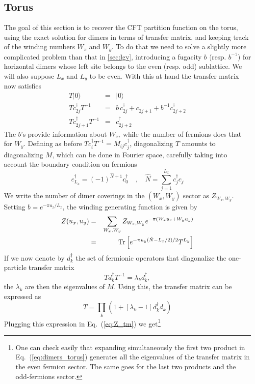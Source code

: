 \documentclass[11pt]{iopart}
\begin{document}
\subsection{Torus}
The goal of this section is to recover the CFT partition function on the torus, using the exact solution for dimers in terms of transfer matrix, and keeping track of the winding numbers $W_x$ and $W_y$. To do that we need to solve a slightly more complicated problem than that in \ref{sec:lgv}, introducing a fugacity $b$ (resp. $b^{-1}$) for horizontal dimers whose left site belongs to the even (resp. odd) sublattice. We will also suppose $L_x$ and $L_y$ to be even. With this at hand the transfer matrix now satisfies
\begin{eqnarray}
T|0\rangle&=&|0\rangle\\
T c_{2j}^\dag T^{-1}&=&b \,c_{2j}^\dag+c_{2j+1}^\dag +b^{-1}c_{2j+2}^\dag\\
T c_{2j+1}^\dag T^{-1}&=&c_{2j+2}^\dag
\end{eqnarray}
The $b$'s provide information about $W_x$, while the number of fermions does that for $W_y$. 
Defining as before $T c_i^\dag T^{-1}=M_{ij} c_j^\dag$, diagonalizing $T$ amounts to diagonalizing $M$, which can be done in Fourier space, carefully taking into account the boundary condition on fermions
\begin{equation}
 c_{L_x}^\dag=(-1)^{\hat{N}+1}c_0^\dag\quad,\quad \hat{N}=\sum_{j=1}^{L_x} c^\dag_j c_j
\end{equation}
We write the number of dimer coverings in the $(W_x,W_y)$ sector as $Z_{W_x,W_y}$. Setting $b=e^{-\pi u_x/L_x}$, the winding generating function is given by
\begin{eqnarray}
 Z(u_x,u_y)&=&\sum_{W_x,W_y} Z_{W_x,W_y}e^{-\pi (W_x u_x+W_y u_y)}\\\label{eq:Z_tm}
 &=&{\rm Tr}\left[\displaystyle{e^{-\pi u_y(\hat{N}-L_x/2)/2}T^{L_y}}\right]
\end{eqnarray}
If we now denote by $d_k^\dag$ the set of fermionic operators that diagonalize the one-particle transfer matrix
\begin{equation}
 T d_k^\dag T^{-1}=\lambda_k d_k^\dag,
\end{equation}
the $\lambda_k$ are then the eigenvalues of $M$. Using this, the transfer matrix can be expressed as
\begin{equation}
 T=\prod_k \left(1+[\lambda_k -1]d_k^\dag d_k \right)
\end{equation}
Plugging this expression in Eq.~(\ref{eq:Z_tm}) we get\footnote{One can check easily that expanding simultaneously the first two product in Eq.~(\ref{eq:dimers_torus}) generates all the eigenvalues of the transfer matrix in the even fermion sector. The same goes for the last two products and the odd-fermions sector. }
\end{document}
